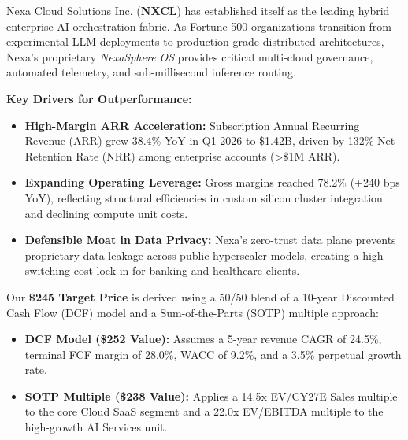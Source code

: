 \documentclass[10pt,a4paper]{scrartcl}
\begin{document}
\hfill
\begin{minipage}[t]{0.65\textwidth}
    \vspace{0pt}
    \begin{tcolorbox}[calloutbox, title=\textcolor{NavyPrimary}{Executive Summary \& Investment Thesis}, colframe=NavyPrimary, colbacktitle=LightBlueBg, coltitle=NavyPrimary]
        \small
        Nexa Cloud Solutions Inc. (\textbf{NXCL}) has established itself as the leading hybrid enterprise AI orchestration fabric. As Fortune 500 organizations transition from experimental LLM deployments to production-grade distributed architectures, Nexa's proprietary \textit{NexaSphere OS} provides critical multi-cloud governance, automated telemetry, and sub-millisecond inference routing.

        \vspace{4pt}
        \textbf{Key Drivers for Outperformance:}
        \begin{itemize}[leftmargin=12pt, itemsep=2pt, topsep=2pt]
            \item \textbf{High-Margin ARR Acceleration:} Subscription Annual Recurring Revenue (ARR) grew 38.4\% YoY in Q1 2026 to \$1.42B, driven by 132\% Net Retention Rate (NRR) among enterprise accounts (>\$1M ARR).
            \item \textbf{Expanding Operating Leverage:} Gross margins reached 78.2\% (+240 bps YoY), reflecting structural efficiencies in custom silicon cluster integration and declining compute unit costs.
            \item \textbf{Defensible Moat in Data Privacy:} Nexa's zero-trust data plane prevents proprietary data leakage across public hyperscaler models, creating a high-switching-cost lock-in for banking and healthcare clients.
        \end{itemize}
    \end{tcolorbox}

    \vspace{4pt}

    \begin{tcolorbox}[calloutbox, title=\textcolor{NavyPrimary}{Valuation Summary \& Target Price Derivation}, colframe=NavyPrimary, colbacktitle=LightBlueBg, coltitle=NavyPrimary]
        \small
        Our \textbf{\$245 Target Price} is derived using a 50/50 blend of a 10-year Discounted Cash Flow (DCF) model and a Sum-of-the-Parts (SOTP) multiple approach:
        \begin{itemize}[leftmargin=12pt, itemsep=2pt, topsep=2pt]
            \item \textbf{DCF Model (\$252 Value):} Assumes a 5-year revenue CAGR of 24.5\%, terminal FCF margin of 28.0\%, WACC of 9.2\%, and a 3.5\% perpetual growth rate.
            \item \textbf{SOTP Multiple (\$238 Value):} Applies a 14.5x EV/CY27E Sales multiple to the core Cloud SaaS segment and a 22.0x EV/EBITDA multiple to the high-growth AI Services unit.
        \end{itemize}
    \end{tcolorbox}
\end{minipage}
\end{document}
